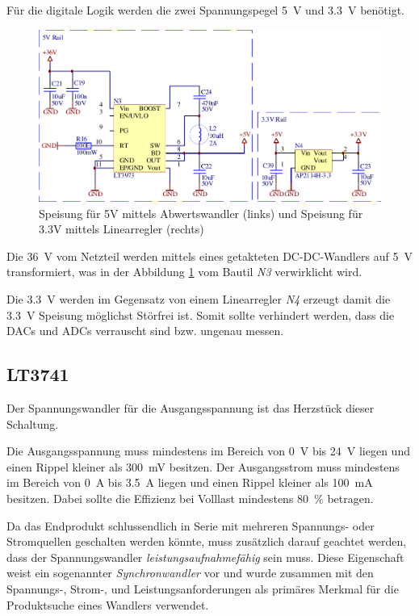 F\"ur die digitale  Logik  werden  die  zwei  Spannungspegel  \SI{5}{\volt}  und
\SI{3.3}{\volt} ben\"otigt. 

\begin{figure}[th!]
    \center
    \includegraphics[width=.75\textwidth]{images/circuit/5v-3v-rails.pdf}
    \caption{Speisung f\"ur 5V mittels Abwertswandler (links) und Speisung f\"ur 3.3V mittels Linearregler (rechts)}
    \label{fig:circuit:rails}
\end{figure}

Die  \SI{36}{\volt} vom Netzteil werden mittels eines getakteten  DC-DC-Wandlers
auf \SI{5}{\volt} transformiert,  was  in  der Abbildung \ref{fig:circuit:rails}
vom Bautil \emph{N3} verwirklicht wird.

Die \SI{3.3}{\volt} werden im Gegensatz von einem Linearregler \emph{N4} erzeugt
damit die  \SI{3.3}{\volt}  Speisung  m\"oglichst  St\"orfrei  ist. Somit sollte
verhindert  werden, dass die DACs und ADCs verrauscht sind bzw. ungenau  messen.

\subsection{LT3741}

Der  Spannungswandler  f\"ur  die  Ausgangsspannung  ist  das Herzst\"uck dieser
Schaltung.

Die  Ausgangsspannung   muss   mindestens   im  Bereich  von  \SI{0}{\volt}  bis
\SI{24}{\volt}  liegen  und   einen  Rippel  kleiner  als  \SI{300}{\milli\volt}
besitzen.  Der  Ausgangsstrom muss mindestens im Bereich von \SI{0}{\ampere} bis
\SI{3.5}{\ampere} liegen  und  einen  Rippel kleiner als \SI{100}{\milli\ampere}
besitzen. Dabei  sollte  die Effizienz bei Volllast mindestens \SI{80}{\percent}
betragen.

Da  das  Endprodukt  schlussendlich  in  Serie  mit  mehreren   Spannungs-  oder
Stromquellen  geschalten  werden  k\"onnte, muss  zus\"atzlich  darauf  geachtet
werden,  dass  der Spannungswandler \emph{leistungsaufnahmef\"ahig}  sein  muss.
Diese Eigenschaft weist  ein  sogenannter  \emph{Synchronwandler}  vor und wurde
zusammen mit den Spannungs-,  Strom-,  und Leistungsanforderungen als prim\"ares
Merkmal f\"ur die Produktsuche eines Wandlers verwendet.

